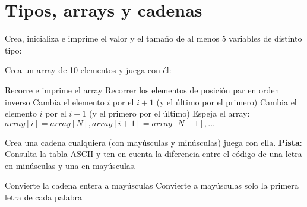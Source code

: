 \documentclass{tareas}
\begin{document}
\maketitle
\newpage
\tableofcontents
{}
\newpage

\section{Tipos, arrays y cadenas}
\begin{problem}
\begin{statement}
	Crea, inicializa e imprime el valor y el tamaño de al menos 5 variables
	de distinto tipo:
	\\
	
	\vspace{-2em}
\end{statement}
\end{problem}


\begin{problem}[Arrays]
\begin{statement}
	Crea un array de 10 elementos y juega con él:

	\begin{subproblems}
		\subp Recorre e imprime el array
		\subp Recorrer los elementos de posición par en orden inverso
		\subp Cambia el elemento $i$ por el $i+1$ (y el último por el
		primero)
		\subp Cambia el elemento $i$ por el $i-1$ (y el primero por el
		último)
		\subp Espeja el array: $array[i] = array[N], array[i+1] =
		array[N-1], \ldots$
	\end{subproblems}
\end{statement}
\end{problem}


\begin{problem}[Cadenas]
\begin{statement}
	Crea una cadena cualquiera (con mayúsculas y minúsculas) juega con ella.
	\textbf{Pista}: Consulta la
	\href{https://es.wikipedia.org/wiki/ASCII#Caracteres_imprimibles_ASCII}{tabla
	ASCII} y ten en cuenta la diferencia entre el código de una letra en
	minúsculas y una en mayúsculas.

	\begin{subproblems}
		\subp Convierte la cadena entera a mayúsculas
		\subp Convierte a mayúsculas solo la primera letra de cada
		palabra
	\end{subproblems}
\end{statement}
\end{problem}
\end{document}
